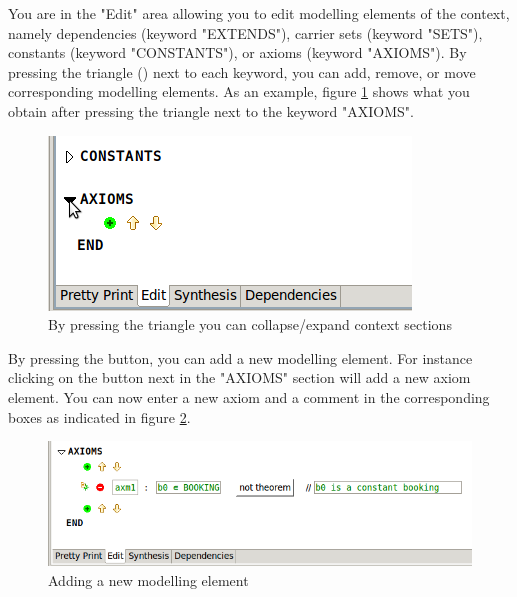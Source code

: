 You are in the "Edit" area allowing you to edit modelling elements of the context, namely dependencies (keyword "EXTENDS"), carrier sets (keyword "SETS"), constants (keyword "CONSTANTS"), or axioms (keyword "AXIOMS"). By pressing the triangle () next to each keyword, you can add, remove, or move corresponding modelling elements. As an example, figure \ref{fig_ref_01_eventb_editor2} shows what you obtain after pressing the triangle next to the keyword "AXIOMS".

\begin{figure}[!h]
\begin{center}
	\includegraphics{img/reference/ref_01_eventb_editor2.png}
	\caption{By pressing the triangle you can collapse/expand context sections}
	\label{fig_ref_01_eventb_editor2}
\end{center}
\end{figure}

By pressing the  button, you can add a new modelling element. For instance clicking on the  button next in the "AXIOMS" section will add a new axiom element. You can now enter a new axiom and a comment in the corresponding boxes as indicated in figure \ref{fig_ref_01_eventb_editor3}.

\begin{figure}[!h]
\begin{center}
	\includegraphics{img/reference/ref_01_eventb_editor3.png}
	\caption{Adding a new modelling element}
	\label{fig_ref_01_eventb_editor3}
\end{center}
\end{figure}


